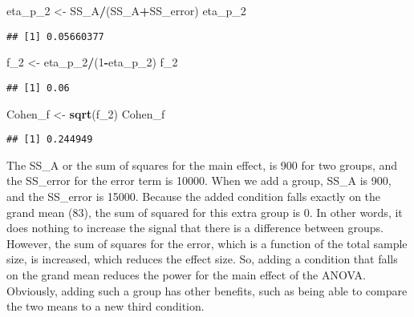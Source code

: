 \documentclass[]{article}
\newenvironment{Shaded}{\begin{snugshade}}{\end{snugshade}}
\newcommand{\KeywordTok}[1]{\textcolor[rgb]{0.13,0.29,0.53}{\textbf{#1}}}
\newcommand{\DecValTok}[1]{\textcolor[rgb]{0.00,0.00,0.81}{#1}}
\newcommand{\StringTok}[1]{\textcolor[rgb]{0.31,0.60,0.02}{#1}}
\newcommand{\OperatorTok}[1]{\textcolor[rgb]{0.81,0.36,0.00}{\textbf{#1}}}
\newcommand{\NormalTok}[1]{#1}
\begin{document}
\begin{Shaded}
\begin{Highlighting}[]
\NormalTok{eta_p_}\DecValTok{2}\NormalTok{ <-}\StringTok{ }\NormalTok{SS_A}\OperatorTok{/}\NormalTok{(SS_A}\OperatorTok{+}\NormalTok{SS_error)}
\NormalTok{eta_p_}\DecValTok{2}
\end{Highlighting}
\end{Shaded}

\begin{verbatim}
## [1] 0.05660377
\end{verbatim}

\begin{Shaded}
\begin{Highlighting}[]
\NormalTok{f_}\DecValTok{2}\NormalTok{ <-}\StringTok{ }\NormalTok{eta_p_}\DecValTok{2}\OperatorTok{/}\NormalTok{(}\DecValTok{1}\OperatorTok{-}\NormalTok{eta_p_}\DecValTok{2}\NormalTok{)}
\NormalTok{f_}\DecValTok{2}
\end{Highlighting}
\end{Shaded}

\begin{verbatim}
## [1] 0.06
\end{verbatim}

\begin{Shaded}
\begin{Highlighting}[]
\NormalTok{Cohen_f <-}\StringTok{ }\KeywordTok{sqrt}\NormalTok{(f_}\DecValTok{2}\NormalTok{)}
\NormalTok{Cohen_f}
\end{Highlighting}
\end{Shaded}

\begin{verbatim}
## [1] 0.244949
\end{verbatim}

The SS\_A or the sum of squares for the main effect, is 900 for two
groups, and the SS\_error for the error term is 10000. When we add a
group, SS\_A is 900, and the SS\_error is 15000. Because the added
condition falls exactly on the grand mean (83), the sum of squared for
this extra group is 0. In other words, it does nothing to increase the
signal that there is a difference between groups. However, the sum of
squares for the error, which is a function of the total sample size, is
increased, which reduces the effect size. So, adding a condition that
falls on the grand mean reduces the power for the main effect of the
ANOVA. Obviously, adding such a group has other benefits, such as being
able to compare the two means to a new third condition.
\end{document}
